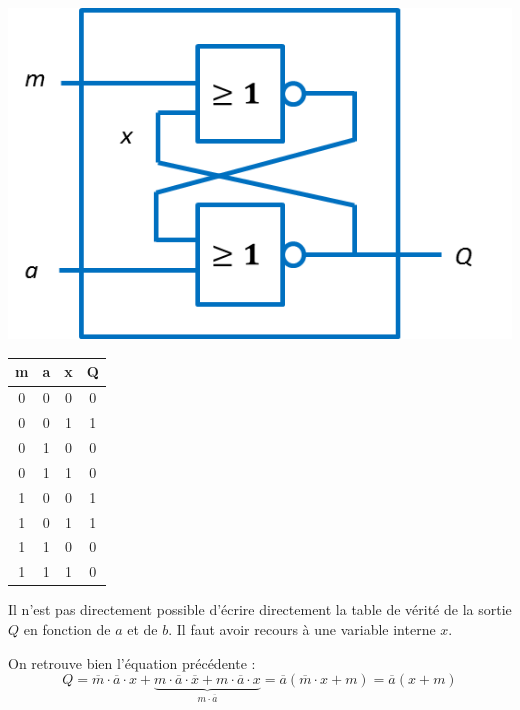 \documentclass[10pt]{article}
\begin{document}
\begin{minipage}[c]{.3\linewidth}
\begin{center}
\includegraphics[width=\textwidth]{images/mem_eff_nor}
\end{center}
\end{minipage} \hfill
\begin{minipage}[c]{.2\linewidth}
\begin{center}
\begin{tabular}{|c|c|c||c|}
\hline
m & a & x & Q \\
\hline \hline
0 & 0 & 0 & 0 \\\hline
0 & 0 & 1 & 1 \\\hline
0 & 1 & 0 & 0 \\\hline
0 & 1 & 1 & 0 \\\hline
1 & 0 & 0 & 1 \\\hline
1 & 0 & 1 & 1 \\\hline
1 & 1 & 0 & 0 \\\hline
1 & 1 & 1 & 0 \\\hline
\end{tabular}
\end{center}
\end{minipage} \hfill
\begin{minipage}[c]{.48\linewidth}
Il  n'est pas directement possible d'écrire directement la table de vérité de la sortie $Q$ en fonction de $a$ et de $b$. Il faut avoir recours à une variable interne $x$. 

On retrouve bien l'équation précédente : 
$$
Q = \overline{m}\cdot \overline{a} \cdot x + \underbrace{m\cdot \overline{a} \cdot \overline{x} 
+ m\cdot \overline{a} \cdot x}_{m\cdot \overline{a} } = \overline{a} \left(\overline{m} \cdot x + m\right)
= \overline{a} \left( x + m\right)
$$

\end{minipage}
\end{document}
